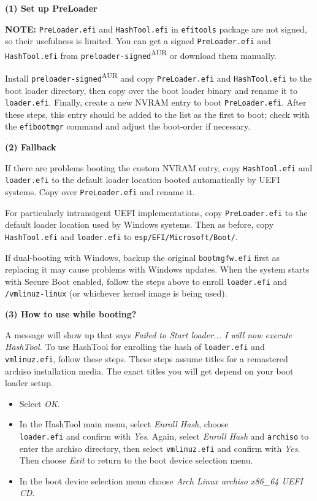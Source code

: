 \documentclass{exam-zh}
\begin{document}
\textbf{(1) Set up PreLoader}

\textbf{NOTE:} \texttt{PreLoader.efi} and \texttt{HashTool.efi} in \texttt{efitools} package are not signed, so their usefulness is limited. You can get a signed \texttt{PreLoader.efi} and \texttt{HashTool.efi} from \texttt{preloader-signed}\textsuperscript{AUR} or download them manually.

Install \texttt{preloader-signed}\textsuperscript{AUR} and copy \texttt{PreLoader.efi} and \texttt{HashTool.efi} to the boot loader directory, then copy over the boot loader binary and rename it to \texttt{loader.efi}. Finally, create a new NVRAM entry to boot \texttt{PreLoader.efi}. After these steps, this entry should be added to the list as the first to boot; check with the \texttt{efibootmgr} command and adjust the boot-order if necessary.

\textbf{(2) Fallback}

If there are problems booting the custom NVRAM entry, copy \texttt{HashTool.efi} and \allowbreak \texttt{loader.efi} to the default loader location booted automatically by UEFI systems. Copy over \texttt{PreLoader.efi} and rename it.

For particularly intransigent UEFI implementations, copy \texttt{PreLoader.efi} to the default loader location used by Windows systems. Then as before, copy \texttt{HashTool.efi} and \texttt{loader.efi} to \texttt{esp/EFI/Microsoft/Boot/}.

If dual-booting with Windows, backup the original \texttt{bootmgfw.efi} first as replacing it may cause problems with Windows updates. When the system starts with Secure Boot enabled, follow the steps above to enroll \texttt{loader.efi} and \texttt{/vmlinuz-linux} (or whichever kernel image is being used).

\textbf{(3) How to use while booting?}

A message will show up that says \textit{Failed to Start loader... I will now execute HashTool.} To use HashTool for enrolling the hash of \texttt{loader.efi} and \texttt{vmlinuz.efi}, follow these steps. These steps assume titles for a remastered archiso installation media. The exact titles you will get depend on your boot loader setup.

\begin{itemize}
\item Select \textit{OK}.

\item In the HashTool main menu, select \textit{Enroll Hash}, choose \texttt{\\loader.efi} and confirm with \textit{Yes}. Again, select \textit{Enroll Hash} and \texttt{archiso} to enter the archiso directory, then select \texttt{vmlinuz.efi} and confirm with \textit{Yes}. Then choose \textit{Exit} to return to the boot device selection menu.

\item In the boot device selection menu choose \textit{Arch Linux archiso x86\_64 UEFI CD}.
\end{itemize}
\end{document}
